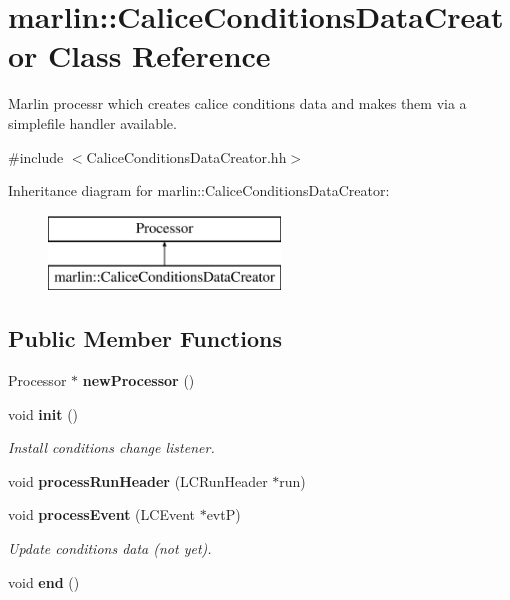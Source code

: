 \section{marlin\-:\-:Calice\-Conditions\-Data\-Creator Class Reference}
\label{classmarlin_1_1CaliceConditionsDataCreator}


Marlin processr which creates calice conditions data and makes them via a simplefile handler available.  




{\ttfamily \#include $<$Calice\-Conditions\-Data\-Creator.\-hh$>$}

Inheritance diagram for marlin\-:\-:Calice\-Conditions\-Data\-Creator\-:\begin{figure}[H]
\begin{center}
\leavevmode
\includegraphics[height=2.000000cm]{classmarlin_1_1CaliceConditionsDataCreator}
\end{center}
\end{figure}
\subsection*{Public Member Functions}
\begin{DoxyCompactItemize}
\item 
Processor $\ast$ {\bfseries new\-Processor} ()\label{classmarlin_1_1CaliceConditionsDataCreator_a602c419bdb5c11770dd620711941f175}

\item 
void {\bf init} ()
\begin{DoxyCompactList}\small\item\em Install conditions change listener. \end{DoxyCompactList}\item 
void {\bfseries process\-Run\-Header} (L\-C\-Run\-Header $\ast$run)\label{classmarlin_1_1CaliceConditionsDataCreator_add37acebb16fb3faa09f17afa353ad6a}

\item 
void {\bf process\-Event} (L\-C\-Event $\ast$evt\-P)\label{classmarlin_1_1CaliceConditionsDataCreator_a1a7b0067f58a6376ab5e9ba73d389280}

\begin{DoxyCompactList}\small\item\em Update conditions data (not yet). \end{DoxyCompactList}\item 
void {\bfseries end} ()\label{classmarlin_1_1CaliceConditionsDataCreator_a7903f04212f4cbb7f95fecd657c289f0}

\end{DoxyCompactItemize}
